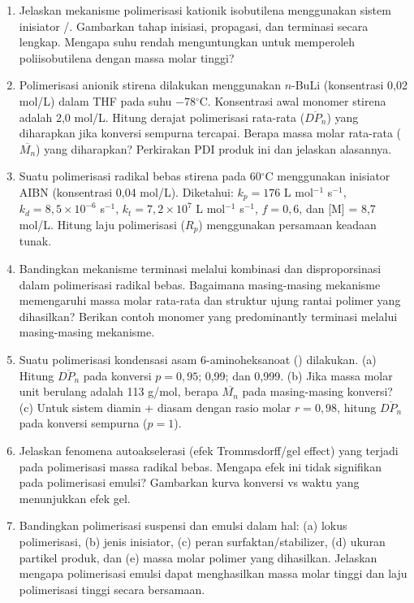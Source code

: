 \documentclass[12pt,a4paper,openany]{book}
\begin{document}
\begin{enumerate}

\item Jelaskan mekanisme polimerisasi kationik isobutilena menggunakan sistem inisiator /. Gambarkan tahap inisiasi, propagasi, dan terminasi secara lengkap. Mengapa suhu rendah menguntungkan untuk memperoleh poliisobutilena dengan massa molar tinggi?

\item Polimerisasi anionik stirena dilakukan menggunakan $n$-BuLi (konsentrasi 0,02 mol/L) dalam THF pada suhu $-$78$^\circ$C. Konsentrasi awal monomer stirena adalah 2,0 mol/L. Hitung derajat polimerisasi rata-rata ($\overline{DP_n}$) yang diharapkan jika konversi sempurna tercapai. Berapa massa molar rata-rata ($\overline{M_n}$) yang diharapkan? Perkirakan PDI produk ini dan jelaskan alasannya.

\item Suatu polimerisasi radikal bebas stirena pada 60$^\circ$C menggunakan inisiator AIBN (konsentrasi 0,04 mol/L). Diketahui: $k_p = 176$ L mol$^{-1}$ s$^{-1}$, $k_d = 8{,}5 \times 10^{-6}$ s$^{-1}$, $k_t = 7{,}2 \times 10^{7}$ L mol$^{-1}$ s$^{-1}$, $f = 0{,}6$, dan [M] = 8,7 mol/L. Hitung laju polimerisasi ($R_p$) menggunakan persamaan keadaan tunak.

\item Bandingkan mekanisme terminasi melalui kombinasi dan disproporsinasi dalam polimerisasi radikal bebas. Bagaimana masing-masing mekanisme memengaruhi massa molar rata-rata dan struktur ujung rantai polimer yang dihasilkan? Berikan contoh monomer yang predominantly terminasi melalui masing-masing mekanisme.

\item Suatu polimerisasi kondensasi asam 6-aminoheksanoat () dilakukan. (a) Hitung $\overline{DP_n}$ pada konversi $p = 0,95$; 0,99; dan 0,999. (b) Jika massa molar unit berulang adalah 113 g/mol, berapa $\overline{M_n}$ pada masing-masing konversi? (c) Untuk sistem diamin + diasam dengan rasio molar $r = 0,98$, hitung $\overline{DP_n}$ pada konversi sempurna ($p = 1$).

\item Jelaskan fenomena autoakselerasi (efek Trommsdorff/gel effect) yang terjadi pada polimerisasi massa radikal bebas. Mengapa efek ini tidak signifikan pada polimerisasi emulsi? Gambarkan kurva konversi vs waktu yang menunjukkan efek gel.

\item Bandingkan polimerisasi suspensi dan emulsi dalam hal: (a) lokus polimerisasi, (b) jenis inisiator, (c) peran surfaktan/stabilizer, (d) ukuran partikel produk, dan (e) massa molar polimer yang dihasilkan. Jelaskan mengapa polimerisasi emulsi dapat menghasilkan massa molar tinggi dan laju polimerisasi tinggi secara bersamaan.


\end{enumerate}
\end{document}
